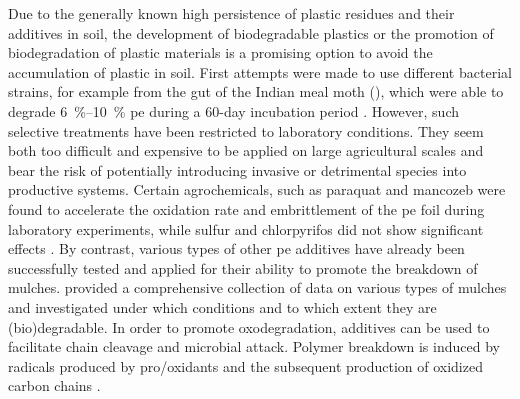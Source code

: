 Due to the generally known high persistence of plastic residues and their additives in soil, the development of biodegradable plastics or the promotion of biodegradation of plastic materials is a promising option to avoid the accumulation of plastic in soil. First attempts were made to use different bacterial strains, for example from the gut of the Indian meal moth (), which were able to degrade \SIrange{6}{10}{\percent} \ac{pe} during a \num{60}-day incubation period \citep{HadadBiodegradation2005,KruegerProspects2015,YangPlastic2015}. However, such selective treatments have been restricted to laboratory conditions. They seem both too difficult and expensive to be applied on large agricultural scales and bear the risk of potentially introducing invasive or detrimental species into productive systems. Certain agrochemicals, such as paraquat and mancozeb were found to accelerate the oxidation rate and embrittlement of the \ac{pe} foil during laboratory experiments, while sulfur and chlorpyrifos did not show significant effects \citep{YehEffect2015}. By contrast, various types of other \ac{pe} additives have already been successfully tested and applied for their ability to promote the breakdown of mulches. \citet{KyrikouBiodegradation2007} provided a comprehensive collection of data on various types of mulches and investigated under which conditions and to which extent they are (bio)degradable. In order to promote oxodegradation, additives can be used to facilitate chain cleavage and microbial attack. Polymer breakdown is induced by radicals produced by pro\-/oxidants and the subsequent production of oxidized carbon chains \citep{BriassoulisDegradation2015}.
